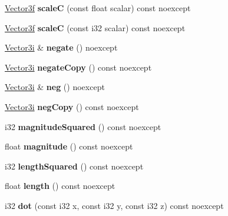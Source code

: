 \begin{DoxyCompactItemize}
\mbox{\hyperlink{class_vector3f}{Vector3f}} {\bfseries scaleC} (const float scalar) const noexcept
\item 
\mbox{\label{class_vector3i_ae565544222b1152b3ca06a9de363afde}} 
\mbox{\hyperlink{class_vector3f}{Vector3f}} {\bfseries scaleC} (const i32 scalar) const noexcept
\item 
\mbox{\label{class_vector3i_ae273b534605c8de7d2e991c02bedf307}} 
\mbox{\hyperlink{class_vector3i}{Vector3i}} \& {\bfseries negate} () noexcept
\item 
\mbox{\label{class_vector3i_a8667c725bc3e54706c9bf684733b2d9e}} 
\mbox{\hyperlink{class_vector3i}{Vector3i}} {\bfseries negate\+Copy} () const noexcept
\item 
\mbox{\label{class_vector3i_a69b53e971c0e77def21ac0d4be3b4604}} 
\mbox{\hyperlink{class_vector3i}{Vector3i}} \& {\bfseries neg} () noexcept
\item 
\mbox{\label{class_vector3i_aaa4036e6e892c32a184924531c306c7f}} 
\mbox{\hyperlink{class_vector3i}{Vector3i}} {\bfseries neg\+Copy} () const noexcept
\item 
\mbox{\label{class_vector3i_ab8b3dbd2086ee48f6ad0bceaf67412f4}} 
i32 {\bfseries magnitude\+Squared} () const noexcept
\item 
\mbox{\label{class_vector3i_a5b56968a18fe35e64b4315a54dd85bf2}} 
float {\bfseries magnitude} () const noexcept
\item 
\mbox{\label{class_vector3i_a03b126deb14e1d329622647ee28252f6}} 
i32 {\bfseries length\+Squared} () const noexcept
\item 
\mbox{\label{class_vector3i_a346f97fdaa19fee84813661fd341a696}} 
float {\bfseries length} () const noexcept
\item 
\mbox{\label{class_vector3i_a454eaaa5036439edd09ef078a6890084}} 
i32 {\bfseries dot} (const i32 x, const i32 y, const i32 z) const noexcept
\item 
\mbox{\label{class_vector3i_a1fe2b4d592deec0f91a5f4f2681c6e1d}} 

\end{DoxyCompactItemize}
